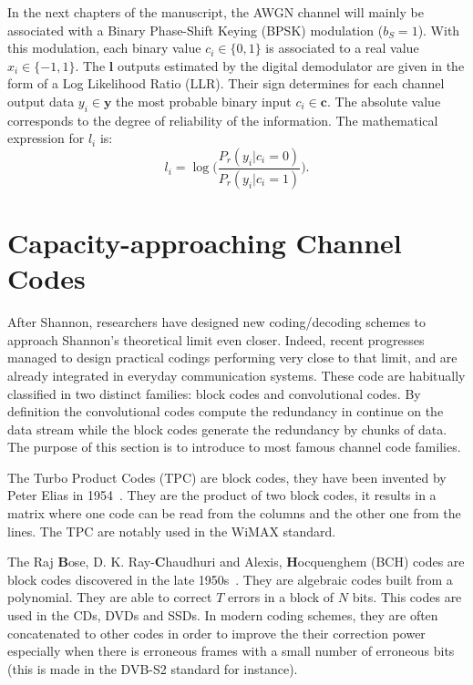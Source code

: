 In the next chapters of the manuscript, the AWGN channel will mainly be
associated with a Binary Phase-Shift Keying (BPSK) modulation ($b_S = 1$). With
this modulation, each binary value $c_i \in \{0,1\}$ is associated to a real
value $x_i \in \{-1,1\}.$ The $\bm{l}$ outputs estimated by the digital
demodulator are given in the form of a Log Likelihood Ratio (LLR). Their sign
determines for each channel output data $y_i \in \bm{y}$ the most probable
binary input $c_i \in \bm{c}$. The absolute value corresponds to the degree of
reliability of the information. The mathematical expression for $l_i$ is:
\begin{equation*}
l_i = \log{\Big(\frac{P_r(y_i|c_i = 0)}{P_r(y_i|c_i = 1)}\Big)}.
\end{equation*}

\section{Capacity-approaching Channel Codes}

After Shannon, researchers have designed new coding/decoding schemes to approach
Shannon's theoretical limit even closer. Indeed, recent progresses managed to
design practical codings performing very close to that limit, and are already
integrated in everyday communication systems. These code are habitually
classified in two distinct families: block codes and convolutional codes. By
definition the convolutional codes compute the redundancy in continue on the
data stream while the block codes generate the redundancy by chunks of data.
The purpose of this section is to introduce to most famous channel code
families.

The Turbo Product Codes (TPC) are block codes, they have been invented by Peter
Elias in 1954~\cite{Elias1954}. They are the product of two block codes, it
results in a matrix where one code can be read from the columns and the other
one from the lines. The TPC are notably used in the WiMAX standard.

The Raj \textbf{B}ose, D. K. Ray-\textbf{C}haudhuri and Alexis,
\textbf{H}ocquenghem (BCH) codes are block codes discovered in the late
1950s~\cite{Hocquenghem1959,Bose1960}. They are algebraic codes built from a
polynomial. They are able to correct $T$ errors in a block of $N$ bits. This
codes are used in the CDs, DVDs and SSDs. In modern coding schemes, they are
often concatenated to other codes in order to improve the their correction power
especially when there is erroneous frames with a small number of erroneous bits
(this is made in the DVB-S2 standard for instance).

